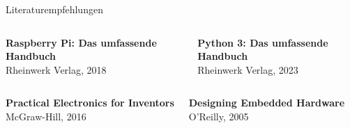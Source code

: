 {
\footnotesize
\setlength{\fboxsep}{0pt}

\begin{frame}{Literaturempfehlungen}
    \hfill
    \hfill
    \hfill

    \vskip 0.6cm

    \begin{columns}
        \textbf{Raspberry Pi: Das umfassende Handbuch} \\ Rheinwerk Verlag, 2018

        \textbf{Python 3: Das umfassende Handbuch} \\ Rheinwerk Verlag, 2023
    \end{columns}

    \vskip 0.6cm

    \begin{columns}
        \textbf{Practical Electronics for Inventors} \\ McGraw-Hill, 2016

        \textbf{Designing Embedded Hardware} \\ O'Reilly, 2005
    \end{columns}
\end{frame}
}

